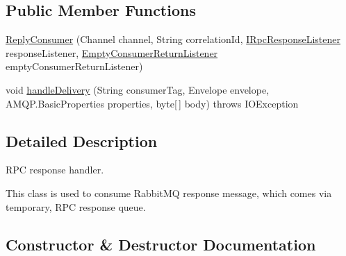 \subsection*{Public Member Functions}
\begin{DoxyCompactItemize}
\item 
\hyperlink{classeu_1_1h2020_1_1symbiote_1_1communication_1_1ReplyConsumer_ac88955046a3768a0b8f83a1719ec8fa1}{Reply\+Consumer} (Channel channel, String correlation\+Id, \hyperlink{interfaceeu_1_1h2020_1_1symbiote_1_1communication_1_1IRpcResponseListener}{I\+Rpc\+Response\+Listener} response\+Listener, \hyperlink{classeu_1_1h2020_1_1symbiote_1_1communication_1_1EmptyConsumerReturnListener}{Empty\+Consumer\+Return\+Listener} empty\+Consumer\+Return\+Listener)
\item 
void \hyperlink{classeu_1_1h2020_1_1symbiote_1_1communication_1_1ReplyConsumer_a34dd66474d8fac50804af8a33642fa1d}{handle\+Delivery} (String consumer\+Tag, Envelope envelope, A\+M\+Q\+P.\+Basic\+Properties properties, byte\mbox{[}$\,$\mbox{]} body)  throws I\+O\+Exception 
\end{DoxyCompactItemize}


\subsection{Detailed Description}
R\+PC response handler. 

This class is used to consume Rabbit\+MQ response message, which comes via temporary, R\+PC response queue. 

\subsection{Constructor \& Destructor Documentation}
